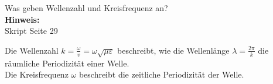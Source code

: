 \begin{question}[section=3,name={Wellenzahl 1},difficulty=,quantity=4,type=thr,tags={20130314}]
	Was geben Wellenzahl und Kreisfrequenz an?
	\\ \textbf{Hinweis:}\\
	Skript Seite 29
\end{question}
\begin{solution}
	Die Wellenzahl $k = \frac{\omega}{v} = \omega\sqrt{\mu\varepsilon}$ beschreibt, wie die Wellenlänge $\lambda = \frac{2\pi}{k}$ die räumliche Periodizität einer Welle.\\
	Die Kreisfrequenz $\omega$ beschreibt die zeitliche Periodizität der Welle.
\end{solution}